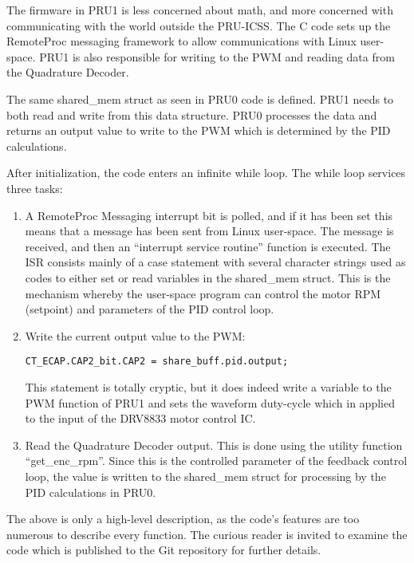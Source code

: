 The firmware in PRU1 is less concerned about math, and more concerned with communicating with the world outside the PRU-ICSS.  The C code sets up the RemoteProc messaging framework to allow communications with Linux user-space.  PRU1 is also responsible for writing to the PWM and reading data from the Quadrature Decoder.

The same shared\_mem struct as seen in PRU0 code is defined.  PRU1 needs to both read and write from this data structure.  PRU0 processes the data and returns an output value to write to the PWM which is determined by the PID calculations.

After initialization, the code enters an infinite while loop.  The while loop services three tasks:

\begin{enumerate}
\item
A RemoteProc Messaging interrupt bit is polled, and if it has been set this means that a message has been sent from Linux user-space.  The message is received, and then an ``interrupt service routine'' function is executed.  The ISR consists mainly of a case statement with several character strings used as codes to either set or read variables in the shared\_mem struct.  This is the mechanism whereby the user-space program can control the motor RPM (setpoint) and parameters of the PID control loop.

\item Write the current output value to the PWM:

\begin{verbatim}
CT_ECAP.CAP2_bit.CAP2 = share_buff.pid.output;
\end{verbatim}

This statement is totally cryptic, but it does indeed write a variable to the PWM function of PRU1 and sets the waveform duty-cycle which in applied to the input of the DRV8833 motor control IC.
\item
Read the Quadrature Decoder output.  This is done using the utility function ``get\_enc\_rpm''.  Since this is the controlled parameter of the feedback control loop, the value is written to the shared\_mem struct for processing by the PID calculations in PRU0.
\end{enumerate}

The above is only a high-level description, as the code's features are too numerous to describe every function.  The curious reader is invited to examine the code which is published to the Git repository for further details.



